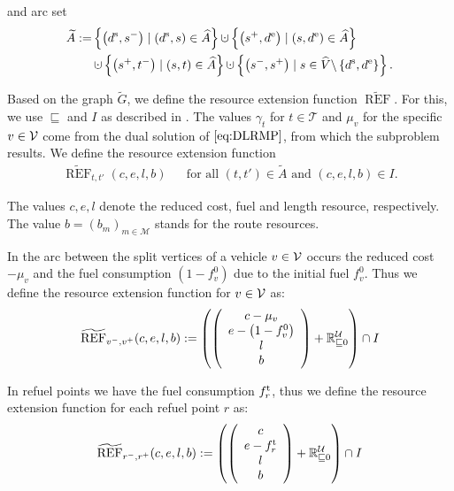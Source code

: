 and arc set
\begin{align*}
	\widetilde{A} := & \left\{\left(\ds,s^-\right)\mid \left(\ds,s\right)\in\widehat{A}\right\}\cupdot\left\{\left(s^+,\de\right)\mid\left(s,\de\right)\in\widehat{A}\right\} \\
	& \cupdot\left\{\left(s^+,t^-\right)\mid (s,t)\in\widehat{A}\right\}\cupdot\left\{\left(s^-,s^+\right)\mid s\in\widehat{V}\backslash\left\{\ds,\de\right\}\right\}.
\end{align*}

Based on the graph $\widetilde{G}$, we define the resource extension function $\widetilde{\operatorname{REF}}$. For this, we use $\sqsubseteq$ and $I$ as described in . The values $\gamma_t$ for $t\in\mathcal{T}$ and $\mu_v$ for the specific $v\in\mathcal{V}$ come from the dual solution of $\eqref{eq:DLRMP}$, from which the subproblem results. We define the resource extension function
\begin{align*}
	\widetilde{\operatorname{REF}}_{t,t'}(c,e,l,b) && \text{for all } \left(t,t'\right)\in\widetilde{A} \text{ and } (c,e,l,b)\in I.
\end{align*}

The values $c, e, l$ denote the reduced cost, fuel and length resource, respectively. The value ${b=\left(b_m\right)_{m\in\mathcal{M}}}$ stands for the route resources. 

In the arc between the split vertices of a vehicle $v\in\mathcal{V}$ occurs the reduced cost $-\mu_v$ and the fuel consumption $\left(1-f^0_v\right)$ due to the initial fuel $f^0_v$. Thus we define the resource extension function for $v\in\mathcal{V}$ as:
\begin{align*}
	\widetilde{\operatorname{REF}}_{v^-,v^+}(c,e,l,b) := \left(\left(
	\begin{array}{c}
		c-\mu_v \\ e-\left(1-f^0_v\right) \\ l \\ b
	\end{array}
	\right) + \mathbb{R}^{\mathcal{U}}_{\sqsubseteq 0}\right) \cap I
\end{align*}

In refuel points we have the fuel consumption $f^{\operatorname{t}}_r$, thus we define the resource extension function for each refuel point $r$ as:
\begin{align*}
	\widetilde{\operatorname{REF}}_{r^-,r^+}(c,e,l,b) := \left(\left(
	\begin{array}{c}
		c \\ e-f^{\operatorname{t}}_r \\ l \\ b
	\end{array}
	\right) + \mathbb{R}^{\mathcal{U}}_{\sqsubseteq 0}\right) \cap I
\end{align*}

